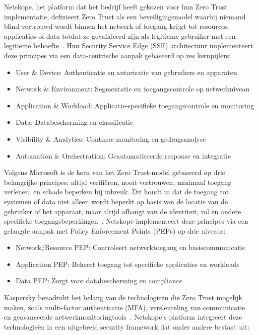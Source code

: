 Netskope, het platform dat het bedrijf heeft gekozen voor hun Zero Trust implementatie, definieert Zero Trust als een beveiligingsmodel waarbij niemand blind vertrouwd wordt binnen het netwerk of toegang krijgt tot resources, applicaties of data totdat ze gevalideerd zijn als legitieme gebruiker met een legitieme behoefte~\autocite{Netskope2020}. Hun Security Service Edge (SSE) architectuur implementeert deze principes via een data-centrische aanpak gebaseerd op zes kernpijlers:

\begin{itemize}
  \item User \& Device: Authenticatie en autorisatie van gebruikers en apparaten
  \item Network \& Environment: Segmentatie en toegangscontrole op netwerkniveau
  \item Application \& Workload: Applicatie-specifieke toegangscontrole en monitoring
  \item Data: Databescherming en classificatie
  \item Visibility \& Analytics: Continue monitoring en gedragsanalyse
  \item Automation \& Orchestration: Geautomatiseerde response en integratie
\end{itemize}

Volgens Microsoft is de kern van het Zero Trust-model gebaseerd op drie belangrijke principes: altijd verifiëren, nooit vertrouwen; minimaal toegang verlenen; en schade beperken bij inbreuk. Dit houdt in dat de toegang tot systemen of data niet alleen wordt beperkt op basis van de locatie van de gebruiker of het apparaat, maar altijd afhangt van de identiteit, rol en andere specifieke toegangsbeperkingen~\autocite{Microsoft2024}. Netskope implementeert deze principes via een gelaagde aanpak met Policy Enforcement Points (PEPs) op drie niveaus:

\begin{itemize}
  \item Network/Resource PEP: Controleert netwerktoegang en basiscommunicatie
  \item Application PEP: Beheert toegang tot specifieke applicaties en workloads
  \item Data PEP: Zorgt voor databescherming en compliance
\end{itemize}

Kaspersky benadrukt het belang van de technologieën die Zero Trust mogelijk maken, zoals multi-factor authenticatie (MFA), versleuteling van communicatie en geavanceerde netwerkmonitoringtools~\autocite{Kaspersky2024}. Netskope's platform integreert deze technologieën in een uitgebreid security framework dat onder andere bestaat uit:

